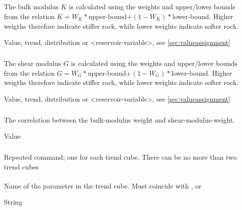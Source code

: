 {\subparagraph{}
 \slist
   \item \Description The bulk modulus $K$ is calculated using the weights and upper/lower bounds from the relation $K=W_K*$upper-bound$+(1-W_K)*$lower-bound. Higher weigths therefore indicate stiffer rock, while lower weights indicate softer rock.
   \item \Argument Value, trend, distribution or <reservoir-variable>, see \autoref{sec:valueassignment}
   \item \Default
 \elist

\subparagraph{}
 \slist
   \item \Description The shear modulus $G$ is calculated using the weights and upper/lower bounds from the relation $G=W_G*$upper-bound$+(1-W_G)*$lower-bound. Higher weigths therefore indicate stiffer rock, while lower weights indicate softer rock.
   \item \Argument Value, trend, distribution or <reservoir-variable>, see \autoref{sec:valueassignment}
   \item \Default
 \elist

\subparagraph{}
 \slist
   \item \Description The correlation between the bulk-modulus weight and shear-modulus-weight.
   \item \Argument Value
   \item {}
 \elist

\subsubsection{}
 \slist
   \item \Description Repeated command; one for each trend cube. There can be no more than two trend cubes
   \item \Argument
   \item \Default
 \elist

\paragraph{}
 \slist
   \item \Description Name of the parameter in the trend cube. Must coincide with ,  or 
   \item \Argument String
   \item \Default
 \elist

}
